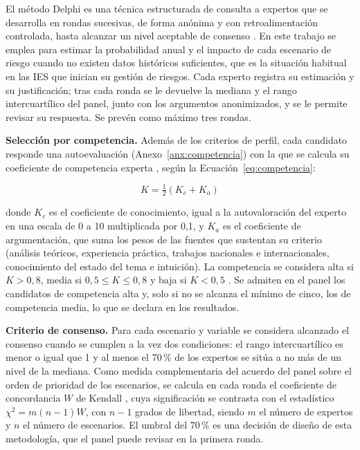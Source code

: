 El método Delphi es una técnica estructurada de consulta a expertos que se desarrolla en rondas sucesivas, de forma anónima y con retroalimentación controlada, hasta alcanzar un nivel aceptable de consenso \cite{okoli2004delphi}. En este trabajo se emplea para estimar la probabilidad anual y el impacto de cada escenario de riesgo cuando no existen datos históricos suficientes, que es la situación habitual en las IES que inician su gestión de riesgos. Cada experto registra su estimación y su justificación; tras cada ronda se le devuelve la mediana y el rango intercuartílico del panel, junto con los argumentos anonimizados, y se le permite revisar su respuesta. Se prevén como máximo tres rondas.

\textbf{Selección por competencia.} Además de los criterios de perfil, cada candidato responde una autoevaluación (Anexo~\ref{anx:competencia}) con la que se calcula su coeficiente de competencia experta \cite{cabero2013competencia}, según la Ecuación~\ref{eq:competencia}:

\begin{equation}
\label{eq:competencia}
K = \tfrac{1}{2}\left(K_c + K_a\right)
\end{equation}

\noindent donde $K_c$ es el coeficiente de conocimiento, igual a la autovaloración del experto en una escala de 0 a 10 multiplicada por 0,1, y $K_a$ es el coeficiente de argumentación, que suma los pesos de las fuentes que sustentan su criterio (análisis teóricos, experiencia práctica, trabajos nacionales e internacionales, conocimiento del estado del tema e intuición). La competencia se considera alta si $K > 0{,}8$, media si $0{,}5 \le K \le 0{,}8$ y baja si $K < 0{,}5$ \cite{cabero2013competencia}. Se admiten en el panel los candidatos de competencia alta y, solo si no se alcanza el mínimo de cinco, los de competencia media, lo que se declara en los resultados.

\textbf{Criterio de consenso.} Para cada escenario y variable se considera alcanzado el consenso cuando se cumplen a la vez dos condiciones: el rango intercuartílico es menor o igual que 1 y al menos el 70\,\% de los expertos se sitúa a no más de un nivel de la mediana. Como medida complementaria del acuerdo del panel sobre el orden de prioridad de los escenarios, se calcula en cada ronda el coeficiente de concordancia $W$ de Kendall \cite{kendall1939rankings}, cuya significación se contrasta con el estadístico $\chi^2 = m(n-1)W$, con $n-1$ grados de libertad, siendo $m$ el número de expertos y $n$ el número de escenarios. El umbral del 70\,\% es una decisión de diseño de esta metodología, que el panel puede revisar en la primera ronda.

